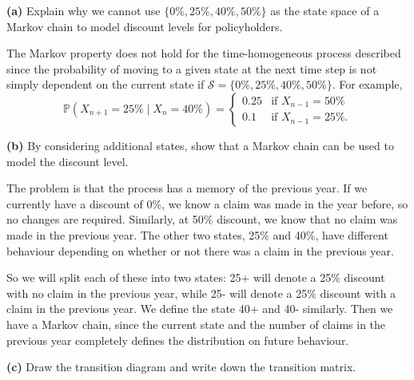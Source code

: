 \documentclass[
  a4paper,
]{article}
\theoremstyle{definition}
\theoremstyle{definition}
\theoremstyle{definition}
\theoremstyle{remark}
\begin{document}
\textbf{(a)} Explain why we cannot use \(\{0\%,25\%,40\%,50\%\}\) as the state space of a Markov chain to model discount levels for policyholders.

\begin{myanswers}
The Markov property does not hold for the time-homogeneous process described since the probability of moving to a given state at the next time step is not simply dependent on the current state if \(\mathcal S=\{0\%,25\%,40\%,50\%\}\). For example,
\[
    \mathbb P(X_{n+1}=25\% \mid X_n= 40\% )=\begin{cases} 
    0.25 & \text{if $X_{n-1}=50\%$}\\
    0.1 & \text{if $X_{n-1}=25\%$.} \end{cases} \]

\end{myanswers}

\textbf{(b)} By considering additional states, show that a Markov chain can be used to model the discount level.

\begin{myanswers}
The problem is that the process has a memory of the previous year.
If we currently have a discount of 0\%, we know a claim was made in the year before, so no changes are required. Similarly, at 50\% discount, we know that no claim was made in the previous year. The other two states, 25\% and 40\%, have different behaviour depending on whether or not there was a claim in the previous year.

So we will split each of these into two states: 25+ will denote a 25\% discount with no claim in the previous year, while 25- will denote a 25\% discount with a claim in the previous year. We define the state 40+ and 40- similarly. Then we have a Markov chain, since the current state and the number of claims in the previous year completely defines the distribution on future behaviour.

\end{myanswers}

\textbf{(c)} Draw the transition diagram and write down the transition matrix.
\end{document}
